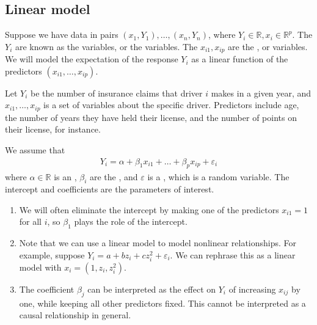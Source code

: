 \subsection{Linear model}
Suppose we have data in pairs $(x_1, Y_1), \dots, (x_n, Y_n)$, where $Y_i \in \mathbb R, x_i \in \mathbb R^p$.
The $Y_i$ are known as the  variables, or the  variables.
The $x_{i1}, x_{ip}$ are the , or  variables.
We will model the expectation of the response $Y_i$ as a linear function of the predictors $(x_{i1}, \dots, x_{ip})$.
\begin{example}
	Let $Y_i$ be the number of insurance claims that driver $i$ makes in a given year, and $x_{i1}, \dots, x_{ip}$ is a set of variables about the specific driver.
	Predictors include age, the number of years they have held their license, and the number of points on their license, for instance.
\end{example}
We assume that
\begin{align*}
	Y_i = \alpha + \beta_1 x_{i1} + \dots + \beta_p x_{ip} + \varepsilon_i
\end{align*}
where $\alpha \in \mathbb R$ is an , $\beta_i$ are the , and $\varepsilon$ is a , which is a random variable.
The intercept and coefficients are the parameters of interest.

\begin{remark}
	\begin{enumerate}
		\item We will often eliminate the intercept by making one of the predictors $x_{i1} = 1$ for all $i$, so $\beta_1$ plays the role of the intercept.
		\item Note that we can use a linear model to model nonlinear relationships.
		For example, suppose $Y_i = a + bz_i + cz_i^2 + \varepsilon_i$.
		We can rephrase this as a linear model with $x_i = (1, z_i, z_i^2)$.
		\item The coefficient $\beta_j$ can be interpreted as the effect on $Y_i$ of increasing $x_{ij}$ by one, while keeping all other predictors fixed.
		This cannot be interpreted as a causal relationship in general.
	\end{enumerate} 
\end{remark} 

